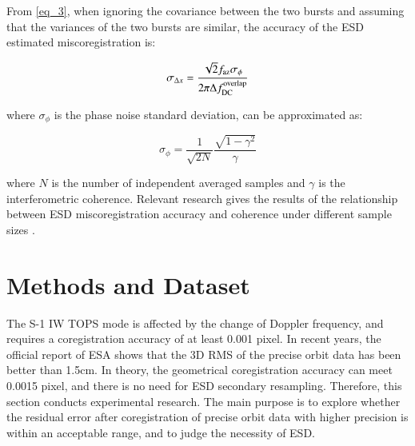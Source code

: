 \documentclass[preprint, authoryear]{elsarticle}
\begin{document}
From \ref{eq_3}, when ignoring the covariance between the two bursts and assuming that the variances of the two bursts are similar, the accuracy of the ESD estimated miscoregistration is: \par

\begin{equation}
    \sigma_{\Delta x} = \frac{\sqrt{2} f_{\rm az} \sigma_\phi}{2 \pi \Delta f_{\rm DC}^{\rm overlap}}
    \label{eq_6}
\end{equation}

\noindent where $\sigma_\phi$ is the phase noise standard deviation, can be approximated as: \par

\begin{equation}
    \sigma_{\phi} = \frac{1}{\sqrt{2N}} \frac{\sqrt{1 - \gamma^2}}{\gamma}
    \label{eq_7}
\end{equation}

\noindent where $N$ is the number of independent averaged samples and $\gamma$ is the interferometric coherence. Relevant research gives the results of the relationship between ESD miscoregistration accuracy and coherence under different sample sizes \cite{A_Network-Based_Enhanced_Spectral_Diversity_Approach_for_TOPS_Time-Series_Analysis}.




\section{Methods and Dataset}


The S-1 IW TOPS mode is affected by the change of Doppler frequency, and requires a coregistration accuracy of at least 0.001 pixel. In recent years, the official report of ESA shows that the 3D RMS of the precise orbit data has been better than 1.5cm. In theory, the geometrical coregistration accuracy can meet 0.0015 pixel, and there is no need for ESD secondary resampling. Therefore, this section conducts experimental research. The main purpose is to explore whether the residual error after coregistration of precise orbit data with higher precision is within an acceptable range, and to judge the necessity of ESD. \par
\end{document}
